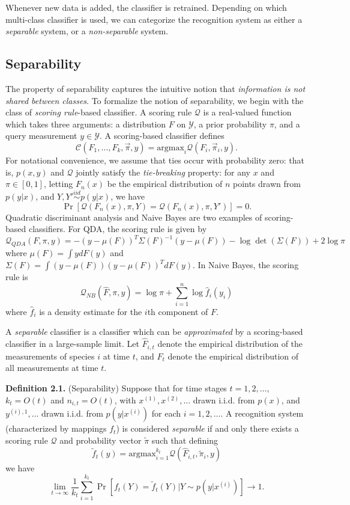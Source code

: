 \documentclass{article}
\newcommand{\argmax}{\text{argmax}}
\begin{document}
Whenever new data is added, the classifier is retrained.
Depending on which multi-class classifier is used, we can categorize the recognition system as either a
\emph{separable} system, or a \emph{non-separable} system.

\subsection{Separability}

The property of separability captures the intuitive notion that \emph{information is not shared between classes}.
To formalize the notion of separability, we begin with the class of \emph{scoring rule}-based classifier.
A scoring rule $\mathcal{Q}$ is a real-valued function which takes three arguments:
a distribution $F$ on $\mathcal{Y}$, a prior probability $\pi$, and a query measurement $y \in \mathcal{Y}$.
A scoring-based classifier defines
 \[
\mathcal{C}(F_1,\hdots, F_k, \vec{\pi}, y) = \argmax_i \mathcal{Q}(F_i, \vec{\pi}_i, y).
\]
For notational convenience, we assume that ties occur with probability zero: that is, $p(x, y)$ and $\mathcal{Q}$ jointly satisfy the \emph{tie-breaking} property:
for any $x$ and $\pi \in [0,1]$,
letting $F_n(x)$ be the empirical distribution of $n$ points drawn from $p(y|x)$, and $Y, Y' \stackrel{iid}{\sim} p(y|x)$,
we have
\begin{equation}\label{eq:tie}
\Pr[\mathcal{Q}(F_n(x), \pi, Y) = \mathcal{Q}(F_n(x), \pi, Y')] = 0.
\end{equation}
Quadratic discriminant analysis and Naive Bayes are two examples of scoring-based classifiers.
For QDA, the scoring rule is given by
\[
\mathcal{Q}_{QDA}(F, \pi, y) = -(y - \mu(F))^T \Sigma(F)^{-1} (y-\mu(F)) - \log\det(\Sigma(F)) + 2\log\pi
\]
where $\mu(F) = \int y dF(y)$ and $\Sigma(F) = \int (y-\mu(F))(y-\mu(F))^T dF(y)$.
In Naive Bayes, the scoring rule is
\[
\mathcal{Q}_{NB}(\hat{F}, \pi, y) = \log\pi + \sum_{i=1}^n \log \hat{f}_i(y_i)
\]
where $\hat{f}_i$ is a density estimate for the $i$th component of $F$.

A \emph{separable} classifier is a classifier which can be \emph{approximated} by a scoring-based classifier
in a large-sample limit. Let $\hat{F}_{i, t}$ denote the empirical distribution of the
measurements of species $i$ at time $t$, and $\hat{F}_t$ denote the empirical distribution of all measurements at time $t$.

\textbf{Definition 2.1.}  (Separability) Suppose that for time stages $t = 1,2,\hdots$, $k_t = O(t)$ and $n_{i,t} = O(t)$,
with $x^{(1)}, x^{(2)},\hdots$ drawn i.i.d. from $p(x)$, and $y^{(i),1},\hdots$ drawn i.i.d. from $p(y|x^{(i)})$ for each $i = 1,2,\hdots$.
A recognition system (characterized by mappings $f_t$) is considered \emph{separable} if and only there exists a scoring rule $\mathcal{Q}$ and probability vector $\tilde{\pi}$
such that defining
\[
\tilde{f}_t(y) = \argmax_{i=1}^{k_t} \mathcal{Q}(\hat{F}_{i, t}, \tilde{\pi}_i, y)
\]
we have
\[
\lim_{t \to \infty} \frac{1}{k_t} \sum_{i=1}^{k_t}\Pr[f_t(Y) = \tilde{f}_t(Y) | Y \sim p(y|x^{(i)})] \to 1.
\]
\end{document}
